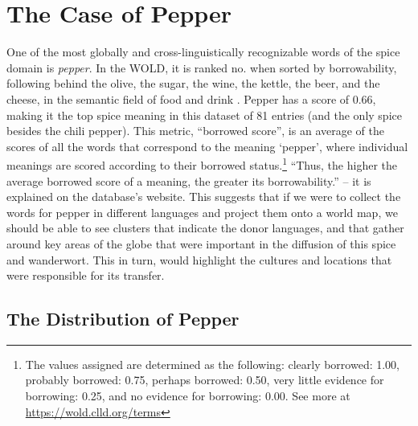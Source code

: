 




\section{The Case of Pepper}

One of the most globally and cross-linguistically recognizable words of the spice domain is \textit{pepper}. In the \gls{WOLD}, it is ranked no.  when sorted by borrowability, following behind the olive, the sugar, the wine, the kettle, the beer, and the cheese, in the semantic field of food and drink \autocite{wold}. Pepper has a score of 0.66, making it the top spice meaning in this dataset of 81 entries (and the only spice besides the chili pepper). This metric, ``borrowed score'', is an average of the scores of all the words that correspond to the meaning `pepper', where individual meanings are scored according to their borrowed status.\footnote{The values assigned are determined as the following: clearly borrowed: 1.00, probably borrowed: 0.75, perhaps borrowed: 0.50, very little evidence for borrowing: 0.25, and no evidence for borrowing: 0.00. See more at \url{https://wold.clld.org/terms}} ``Thus, the higher the average borrowed score of a meaning, the greater its borrowability.'' -- it is explained on the database's website. This suggests that if we were to collect the words for pepper in different languages and project them onto a world map, we should be able to see clusters that indicate the donor languages, and that gather around key areas of the globe that were important in the diffusion of this spice and \gls{wanderwort}. This in turn, would highlight the cultures and locations that were responsible for its transfer.

\subsection{The Distribution of Pepper}

